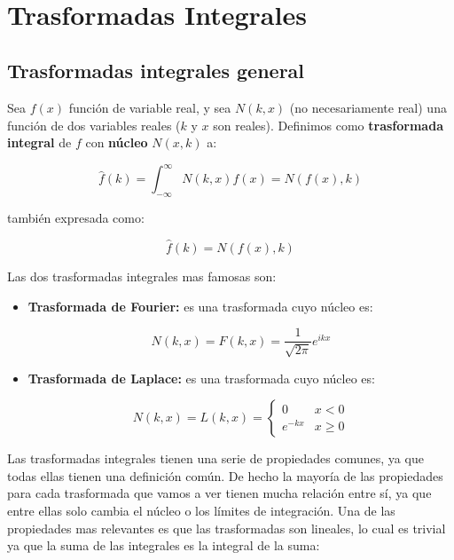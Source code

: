 \documentclass[12pt]{book}
\newcommand{\hatf}{\widehat{f}}
\begin{document}
\hrulefill \\




\newpage
\chapter{Trasformadas Integrales}
\section{Trasformadas integrales general}

Sea $f(x)$ función de variable real, y sea $N(k,x)$ (no necesariamente real) una función de dos variables reales ($k$ y $x$ son reales). Definimos como \textbf{trasformada integral} de $f$ con \textbf{núcleo} $N(x,k)$ a:

\begin{equation}
\widehat{f}(k) = \int_{-\infty}^{\infty} N(k,x) f(x) = N(f(x),k)
\end{equation}

también expresada como:

\begin{equation}
\hatf (k) = N(f(x),k)
\end{equation}


Las dos trasformadas integrales mas famosas son:


\begin{itemize}
\item \textbf{Trasformada de Fourier:} es una trasformada cuyo núcleo es:

\begin{equation}
N(k,x) = F(k,x) = \dfrac{1}{\sqrt{2 \pi}} e^{ikx}
\end{equation}

\item \textbf{Trasformada de Laplace:} es una trasformada cuyo núcleo es:

\begin{equation}
N(k,x) = L(k,x) =  \left\lbrace \begin{array}{ll} 0 & x < 0 \\ e^{-kx} & x \geq 0 \end{array} \right.
\end{equation}
\end{itemize}

Las trasformadas integrales tienen una serie de propiedades comunes, ya que todas ellas tienen una definición común. De hecho la mayoría de las propiedades para cada trasformada que vamos a ver tienen mucha relación entre sí, ya que entre ellas solo cambia el núcleo o los límites de integración. Una de las propiedades mas relevantes es que las trasformadas son lineales, lo cual es trivial ya que la suma de las integrales es la integral de la suma:
\end{document}
